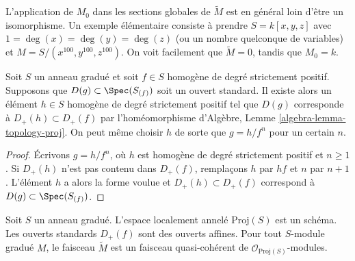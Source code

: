 \begin{remark}
\label{remark-global-sections-not-isomorphism}
L'application de $M_0$ dans les sections globales de $\widetilde M$ est en
général loin d'être un isomorphisme. Un exemple élémentaire consiste à prendre
$S = k[x, y, z]$ avec $1 = \deg(x) = \deg(y) = \deg(z)$ (ou un nombre
quelconque de variables) et
$M = S/(x^{100}, y^{100}, z^{100})$. On voit facilement que
$\widetilde M = 0$, tandis que $M_0 = k$.
\end{remark}

\begin{lemma}
\label{lemma-standard-open-proj}
Soit $S$ un anneau gradué et soit $f \in S$ homogène de degré strictement
positif. Supposons que $D(g) \subset \Spec(S_{(f)})$ soit un ouvert standard.
Il existe alors un élément $h \in S$ homogène de degré strictement positif tel
que $D(g)$ corresponde à $D_{+}(h) \subset D_{+}(f)$ par l'homéomorphisme
d'Algèbre, Lemme \ref{algebra-lemma-topology-proj}. On peut même choisir $h$
de sorte que $g = h/f^n$ pour un certain $n$.
\end{lemma}

\begin{proof}
Écrivons $g = h/f^n$, où $h$ est homogène de degré strictement positif et
$n \geq 1$. Si $D_{+}(h)$ n'est pas contenu dans $D_{+}(f)$, remplaçons $h$
par $hf$ et $n$ par $n + 1$. L'élément $h$ a alors la forme voulue et
$D_{+}(h) \subset D_{+}(f)$ correspond à
$D(g) \subset \Spec(S_{(f)})$.
\end{proof}

\begin{lemma}
\label{lemma-proj-scheme}
Soit $S$ un anneau gradué. L'espace localement annelé $\text{Proj}(S)$ est un
schéma. Les ouverts standards $D_{+}(f)$ sont des ouverts affines. Pour tout
$S$-module gradué $M$, le faisceau $\widetilde M$ est un faisceau
quasi-cohérent de $\mathcal{O}_{\text{Proj}(S)}$-modules.
\end{lemma}

